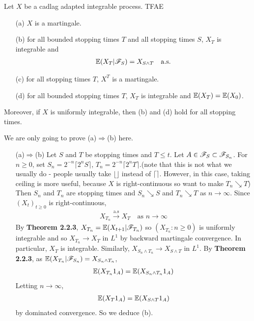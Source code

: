 \documentclass[12pt,a4paper]{report}
\newenvironment{proof}
{\begin{changemargin}{1cm}{0.5cm} 
	}%
	{\end{changemargin}
}
\begin{document}
 Let $X$ be a cadlag adapted integrable process. TFAE
\begin{itemize}
\item[(a)] $X$ is a martingale.
\item[(b)] for all bounded stopping times $T$ and all stopping times $S$, $X_T$ is integrable and
\begin{align*}
\mathbb{E}(X_T |\mathscr{F}_S) = X_{S\wedge T} \quad \text{a.s.} 
\end{align*}
\item[(c)] for all stopping times $T$, $X^T$ is a martingale.
\item[(d)] for all bounded stopping times $T$, $X_T$ is integrable and $\mathbb{E} (X_T) = \mathbb{E}(X_0)$.
\end{itemize}
Moreover, if $X$ is uniformly integrable, then (b) and (d) hold for all stopping times.
\begin{proof}
\pf We are only going to prove (a)$\Rightarrow$(b) here.
\begin{itemize}
\item[(a)$\Rightarrow$(b)] Let $S$ and $T$ be stopping times and $T\leq t$. Let $A\in \mathscr{F}_S \subset \mathscr{F}_{S_n}$. For $n \geq 0$, set $S_n = 2^{-n} \lceil 2^n S \rceil$, $T_n = 2^{-n} \lceil 2^n T \rceil$.(note that this is not what we usually do - people usually take $\lfloor \rfloor$ instead of $\lceil \rceil$. However, in this case, taking ceiling is more useful, because $X$ is right-continuous so want to make $T_n \searrow T$) Then $S_n$ and $T_n$ are stopping times and $S_n \searrow S$ and $T_n \searrow T$ as $n\rightarrow \infty$. Since $(X_t)_{t\geq 0}$ is right-continuous, 
\begin{align*}
X_{T_n} \xrightarrow{\text{a.s}} X_T \quad \text{as } n\rightarrow \infty
\end{align*}
By \textbf{Theorem 2.2.3}, $X_{T_n} = \mathbb{E}(X_{t+1}|\mathscr{F}_{T_n})$ so $(X_{T_n} : n\geq 0)$ is uniformly integrable and so $X_{T_n} \rightarrow X_T$ in $L^1$ by backward martingale convergence. In particular, $X_T$ is integrable. Similarly,  $X_{S_n \wedge T_n} \rightarrow X_{S\wedge T}$ in $L^1$. By \textbf{Theorem 2.2.3}, as $\mathbb{E}(X_{T_n} |\mathscr{F}_{S_n}) = X_{S_n \wedge T_n}$,
\begin{align*}
\mathbb{E}(X_{T_n}1_A) = \mathbb{E}(X_{S_n \wedge T_n} 1_A)
\end{align*} 
Letting $n\rightarrow \infty$,
\begin{align*}
\mathbb{E}(X_T 1_A) = \mathbb{E}(X_{S\wedge T}1_A)
\end{align*}
by dominated convergence. So we deduce (b).
\end{itemize}

\eop
\end{proof}
\end{document}
